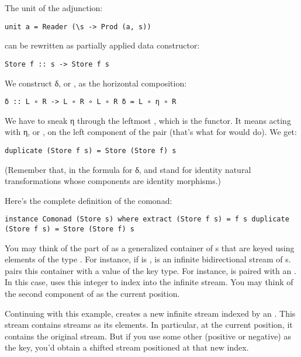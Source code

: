 The unit of the adjunction:

\begin{verbatim}
unit a = Reader (\s -> Prod (a, s))
\end{verbatim}

can be rewritten as partially applied data constructor:

\begin{verbatim}
Store f :: s -> Store f s
\end{verbatim}

We construct δ, or , as the horizontal composition:

\begin{verbatim}
δ :: L ∘ R -> L ∘ R ∘ L ∘ R δ = L ∘ η ∘ R
\end{verbatim}

We have to sneak η through the leftmost , which is the
 functor. It means acting with η, or , on
the left component of the pair (that's what  for
 would do). We get:

\begin{verbatim}
duplicate (Store f s) = Store (Store f) s
\end{verbatim}

(Remember that, in the formula for δ,  and  stand
for identity natural transformations whose components are identity
morphisms.)

Here's the complete definition of the  comonad:

\begin{verbatim}
instance Comonad (Store s) where extract (Store f s) = f s duplicate (Store f s) = Store (Store f) s
\end{verbatim}

You may think of the  part of  as a
generalized container of s that are keyed using elements of
the type . For instance, if  is ,
 is an infinite bidirectional stream of
s.  pairs this container with a value of the key
type. For instance,  is paired with an
. In this case,  uses this integer to index
into the infinite stream. You may think of the second component of
 as the current position.

Continuing with this example,  creates a new infinite
stream indexed by an . This stream contains streams as its
elements. In particular, at the current position, it contains the
original stream. But if you use some other  (positive or
negative) as the key, you'd obtain a shifted stream positioned at that
new index.

